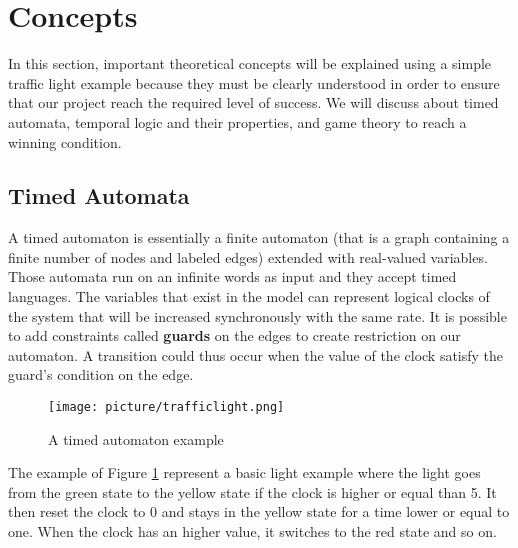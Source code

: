 \section{Concepts}
In this section, important theoretical concepts will be explained using a simple traffic light example because they must be clearly understood in order to ensure that our project reach the required level of success. We will discuss about timed automata, temporal logic and their properties, and game theory to reach a winning condition.

\subsection{Timed Automata} \label{sec:automate}
A timed automaton is essentially a finite automaton (that is a graph
containing a finite number of nodes and labeled edges) extended with real-valued variables. Those automata run on an infinite words as input and they accept timed languages. The variables that exist in the model can represent logical clocks of the system that will be increased synchronously with the same rate.
It is possible to add constraints called \textbf{guards} on the edges to create restriction on our automaton. A transition could thus occur when the value of the clock satisfy the guard's condition on the edge.

\begin{figure}[H]\label{fig:timed}
  \centering
    \texttt{[image: picture/trafficlight.png]}
    \caption{A timed automaton example}
\end{figure}

The example of Figure \ref{fig:timed} represent a basic light example where the light goes from the green state to the yellow state if the clock is higher or equal than 5. It then reset the clock to 0 and stays in the yellow state for a time lower or equal to one. When the clock has an higher value, it switches to the red state and so on.

